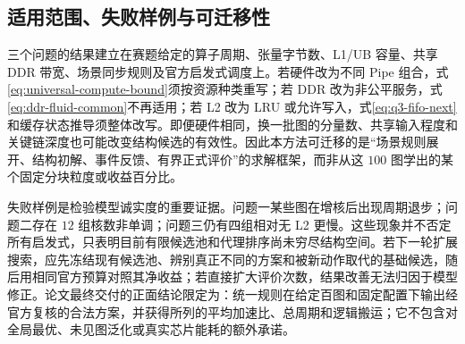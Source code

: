 \subsection{适用范围、失败样例与可迁移性}
三个问题的结果建立在赛题给定的算子周期、张量字节数、L1/UB 容量、共享 DDR 带宽、场景同步规则及官方启发式调度上。若硬件改为不同 Pipe 组合，式\eqref{eq:universal-compute-bound}须按资源种类重写；若 DDR 改为非公平服务，式\eqref{eq:ddr-fluid-common}不再适用；若 L2 改为 LRU 或允许写入，式\eqref{eq:q3-fifo-next}和缓存状态推导须整体改写。即便硬件相同，换一批图的分量数、共享输入程度和关键链深度也可能改变结构候选的有效性。因此本方法可迁移的是“场景规则展开、结构初解、事件反馈、有界正式评价”的求解框架，而非从这 $100$ 图学出的某个固定分块粒度或收益百分比。

失败样例是检验模型诚实度的重要证据。问题一某些图在增核后出现周期退步；问题二存在 $12$ 组核数非单调；问题三仍有四组相对无 L2 更慢。这些现象并不否定所有启发式，只表明目前有限候选池和代理排序尚未穷尽结构空间。若下一轮扩展搜索，应先冻结现有候选池、辨别真正不同的方案和被新动作取代的基础候选，随后用相同官方预算对照其净收益；若直接扩大评价次数，结果改善无法归因于模型修正。论文最终交付的正面结论限定为：统一规则在给定百图和固定配置下输出经官方复核的合法方案，并获得所列的平均加速比、总周期和逻辑搬运；它不包含对全局最优、未见图泛化或真实芯片能耗的额外承诺。
